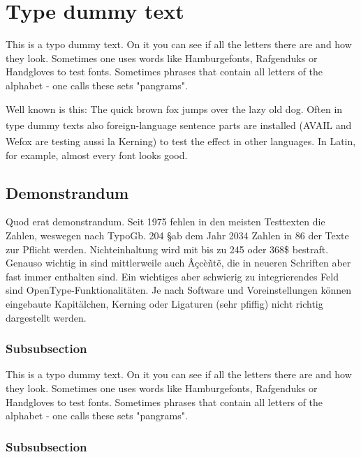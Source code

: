 \section{Type dummy text}
\label{sec:typeareatest_typedummytext}

This is a typo dummy text. On it you can see if all the letters there are and how they look. Sometimes one uses words like Hamburgefonts, Rafgenduks or Handgloves to test fonts. Sometimes phrases that contain all letters of the alphabet - one calls these sets "pangrams".

Well known is this: The quick brown fox jumps over the lazy old dog. Often in type dummy texts also foreign-language sentence parts are installed (AVAIL\textsuperscript{\texttrademark} and Wefox\textsuperscript{\textregistered} are testing aussi la Kerning) to test the effect in other languages. In Latin, for example, almost every font looks good.

\subsection{Demonstrandum}
\label{subsec:satzspiegeltest_typoblindtext_demonstrandum}

Quod erat demonstrandum. Seit 1975 fehlen in den meisten Testtexten die Zahlen, weswegen nach TypoGb. 204 \S ab dem Jahr 2034 Zahlen in 86 der Texte zur Pflicht werden. Nichteinhaltung wird mit bis zu 245 \texteuro oder 368\$ bestraft. Genauso wichtig in sind mittlerweile auch \^A\c{c}c\`e\~nt\"e, die in neueren Schriften aber fast immer enthalten sind. Ein wichtiges aber schwierig zu integrierendes Feld sind OpenType-Funktionalit\"aten. Je nach Software und Voreinstellungen k\"onnen eingebaute Kapit\"alchen, Kerning oder Ligaturen (sehr pfiffig) nicht richtig dargestellt werden.

\subsubsection{Subsubsection}

This is a typo dummy text. On it you can see if all the letters there are and how they look. Sometimes one uses words like Hamburgefonts, Rafgenduks or Handgloves to test fonts. Sometimes phrases that contain all letters of the alphabet - one calls these sets "pangrams". 

\subsubsection{Subsubsection}

